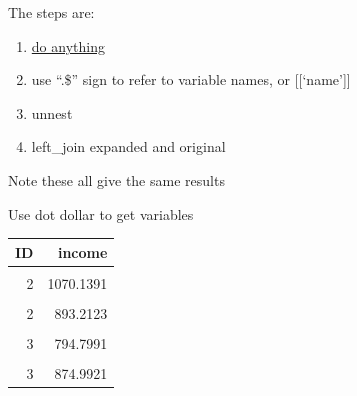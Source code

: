 \documentclass[
]{book}
\newenvironment{Shaded}{\begin{snugshade}}{\end{snugshade}}
\newcommand{\AttributeTok}[1]{\textcolor[rgb]{0.77,0.63,0.00}{#1}}
\newcommand{\CommentTok}[1]{\textcolor[rgb]{0.56,0.35,0.01}{\textit{#1}}}
\newcommand{\FunctionTok}[1]{\textcolor[rgb]{0.00,0.00,0.00}{#1}}
\newcommand{\NormalTok}[1]{#1}
\newcommand{\OtherTok}[1]{\textcolor[rgb]{0.56,0.35,0.01}{#1}}
\newcommand{\SpecialCharTok}[1]{\textcolor[rgb]{0.00,0.00,0.00}{#1}}
\providecommand{\tightlist}{%
  \setlength{\itemsep}{0pt}\setlength{\parskip}{0pt}}
\begin{document}
The steps are:

\begin{enumerate}
\def\labelenumi{\arabic{enumi}.}
\tightlist
\item
  \href{https://dplyr.tidyverse.org/reference/do.html}{do anything}
\item
  use ``.\$'' sign to refer to variable names, or {[}{[}`name'{]}{]}
\item
  unnest
\item
  left\_join expanded and original
\end{enumerate}

Note these all give the same results

Use dot dollar to get variables

\begin{Shaded}
\end{Shaded}

\begin{table}[!h]
\centering
\begin{tabular}{r|r}
\hline
ID & income\\
\hline
\cellcolor{gray!6}{1} & \cellcolor{gray!6}{999.9803}\\
\hline
2 & 1070.1391\\
\hline
\cellcolor{gray!6}{2} & \cellcolor{gray!6}{952.7185}\\
\hline
2 & 893.2123\\
\hline
\cellcolor{gray!6}{3} & \cellcolor{gray!6}{956.4050}\\
\hline
3 & 794.7991\\
\hline
\cellcolor{gray!6}{3} & \cellcolor{gray!6}{854.2218}\\
\hline
3 & 874.9921\\
\hline
\end{tabular}
\end{table}
\end{document}
